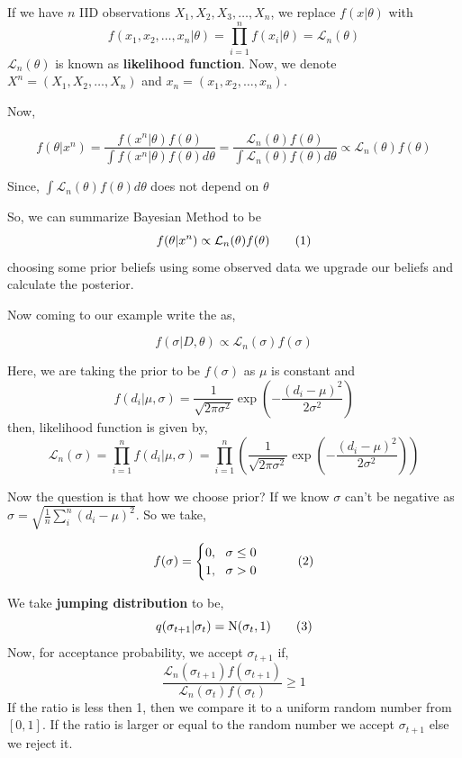 \begin{example}
    If we have $ n $ IID observations $ X_1,X_2,X_3,\ldots,X_n $, we replace $ f(x|\theta) $ with 
    \[
        f(x_1,x_2,\ldots,x_n|\theta) = \prod_{i=1}^{n} f(x_i|\theta) = \mathcal{L}_n(\theta)
    \]
    $ \mathcal{L}_n(\theta) $ is known as \textbf{likelihood function}. Now, we denote $ X^{n} = (X_1,X_2,\ldots,X_n) $ and $ x_n = (x_1,x_2,\ldots,x_n) $. 

    Now, 

    \begin{equation}
        f(\theta|x^{n} ) = \frac{f(x^{n}|\theta)f(\theta) }{\int f(x^{n}|\theta)f(\theta)d \theta } = \frac{\mathcal{L}_n(\theta)f(\theta)}{\int \mathcal{L}_n(\theta) f(\theta)d \theta} \propto \mathcal{L}_n(\theta)f(\theta)
    \end{equation}
    
    Since, $ \int \mathcal{L}_n(\theta)f(\theta)d \theta  $ does not depend on $ \theta $

    So, we can summarize Bayesian Method to be
    \[
        f(\theta|x^{n} ) \propto \mathcal{L}_n(\theta)f(\theta) \label{eq:bayesian method} \numberthis
    \]
    choosing some prior beliefs using some observed data we upgrade our beliefs and calculate the posterior.

    Now coming to our example write the  as,

    \[
        f(\sigma|D,\theta) \propto \mathcal{L}_n(\sigma)f(\sigma)
    \]

    Here, we are taking the prior to be $ f(\sigma) $ as $ \mu $ is constant and 
    \[
        f(d_i|\mu,\sigma) = \frac{1}{\sqrt{2 \pi \sigma^2}} \exp \left( - \frac{(d_i -\mu )^2}{2 \sigma^2} \right)
    \]
    then, likelihood function is given by,
    \[
        \mathcal{L}_n(\sigma) = \prod_{i=1}^{n} f(d_i|\mu,\sigma) = \prod_{i=1}^{n} \left( \frac{1}{\sqrt{2 \pi \sigma^2}} \exp \left( - \frac{(d_i -\mu )^2}{2 \sigma^2} \right) \right)
    \]

    Now the question is that how we choose prior? If we know $ \sigma $ can't be negative as $ \sigma = \sqrt{ \frac{1}{n} \sum_{i}^{n} (d_i - \mu)^2 } $. So we take,

    \[
        f(\sigma) = 
        \begin{cases}
            0, \ \ \sigma \le 0 \\
            1, \ \ \sigma > 0
        \end{cases} \numberthis \label{eq:prior}
    \]

    We take \textbf{jumping distribution}  to be,
    \[
        q(\sigma_{t+1}|\sigma_{t}) = \text{N}(\sigma_t,1) \label{eq:jumping for mh example2} \numberthis
    \]
    Now, for acceptance probability,
    we accept $ \sigma_{t+1} $ if,
    \begin{equation}
        \label{eq:1st accept mh example2}
        \frac{\mathcal{L}_n(\sigma_{t+1})f(\sigma_{t+1})}{\mathcal{L}_n(\sigma_{t})f(\sigma_{t})} \ge 1
    \end{equation}
    If the ratio is less then 1, then we compare it to a uniform random number from $ [0,1] $. If the ratio is larger or equal to the random number we accept $ \sigma_{t+1} $ else we reject it.


\end{example}
